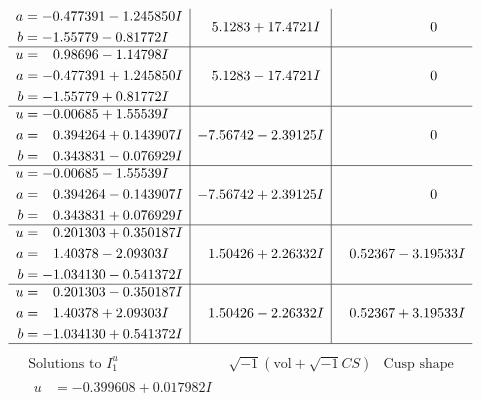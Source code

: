 \documentclass[1p]{elsarticle_modified}
\theoremstyle{definition}
\newcommand{\I}{\sqrt{-1}}
\begin{document}
$$\begin{array}{c|c|c}
\begin{aligned}
a &= -0.477391 - 1.245850 I \\
b &= -1.55779 - 0.81772 I\end{aligned}
 & \phantom{-}5.1283 + 17.4721 I & \phantom{-0.000000 } 0 \\ \hline\begin{aligned}
u &= \phantom{-}0.98696 - 1.14798 I \\
a &= -0.477391 + 1.245850 I \\
b &= -1.55779 + 0.81772 I\end{aligned}
 & \phantom{-}5.1283 - 17.4721 I & \phantom{-0.000000 } 0 \\ \hline\begin{aligned}
u &= -0.00685 + 1.55539 I \\
a &= \phantom{-}0.394264 + 0.143907 I \\
b &= \phantom{-}0.343831 - 0.076929 I\end{aligned}
 & -7.56742 - 2.39125 I & \phantom{-0.000000 } 0 \\ \hline\begin{aligned}
u &= -0.00685 - 1.55539 I \\
a &= \phantom{-}0.394264 - 0.143907 I \\
b &= \phantom{-}0.343831 + 0.076929 I\end{aligned}
 & -7.56742 + 2.39125 I & \phantom{-0.000000 } 0 \\ \hline\begin{aligned}
u &= \phantom{-}0.201303 + 0.350187 I \\
a &= \phantom{-}1.40378 - 2.09303 I \\
b &= -1.034130 - 0.541372 I\end{aligned}
 & \phantom{-}1.50426 + 2.26332 I & \phantom{-}0.52367 - 3.19533 I \\ \hline\begin{aligned}
u &= \phantom{-}0.201303 - 0.350187 I \\
a &= \phantom{-}1.40378 + 2.09303 I \\
b &= -1.034130 + 0.541372 I\end{aligned}
 & \phantom{-}1.50426 - 2.26332 I & \phantom{-}0.52367 + 3.19533 I\\
 \hline 
 \end{array}$$\newpage$$\begin{array}{c|c|c}  
\text{Solutions to }I^u_{1}& \I (\text{vol} + \sqrt{-1}CS) & \text{Cusp shape}\\
 \hline 
\begin{aligned}
u &= -0.399608 + 0.017982 I \\

\end{aligned}
\end{array}$$
\end{document}
